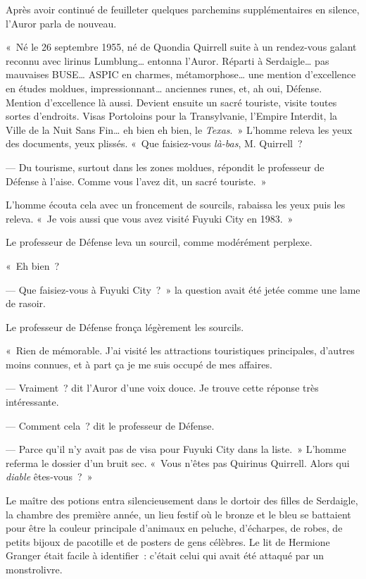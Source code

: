 Après avoir continué de feuilleter quelques parchemins supplémentaires en silence, l'Auror parla de nouveau.

«~Né le 26 septembre 1955, né de Quondia Quirrell suite à un rendez-vous galant reconnu avec lirinus Lumblung… entonna l'Auror. Réparti à Serdaigle… pas mauvaises BUSE… ASPIC en charmes, métamorphose… une mention d'excellence en études moldues, impressionnant… anciennes runes, et, ah oui, Défense. Mention d'excellence là aussi. Devient ensuite un sacré touriste, visite toutes sortes d'endroits. Visas Portoloins pour la Transylvanie, l'Empire Interdit, la Ville de la Nuit Sans Fin… eh bien eh bien, le \emph{Texas}.~» L'homme releva les yeux des documents, yeux plissés. «~Que faisiez-vous \emph{là-bas}, M. Quirrell~?

--- Du tourisme, surtout dans les zones moldues, répondit le professeur de Défense à l'aise. Comme vous l'avez dit, un sacré touriste.~»

L'homme écouta cela avec un froncement de sourcils, rabaissa les yeux puis les releva. «~Je vois aussi que vous avez visité Fuyuki City en 1983.~»

Le professeur de Défense leva un sourcil, comme modérément perplexe.

«~Eh bien~?

--- Que faisiez-vous à Fuyuki City~?~» la question avait été jetée comme une lame de rasoir.

Le professeur de Défense fronça légèrement les sourcils.

«~Rien de mémorable. J'ai visité les attractions touristiques principales, d'autres moins connues, et à part ça je me suis occupé de mes affaires.

--- Vraiment~? dit l'Auror d'une voix douce. Je trouve cette réponse très intéressante.

--- Comment cela~? dit le professeur de Défense.

--- Parce qu'il n'y avait pas de visa pour Fuyuki City dans la liste.~» L'homme referma le dossier d'un bruit sec. «~Vous n'êtes pas Quirinus Quirrell. Alors qui \emph{diable} êtes-vous~?~»

\later

Le maître des potions entra silencieusement dans le dortoir des filles de Serdaigle, la chambre des première année, un lieu festif où le bronze et le bleu se battaient pour être la couleur principale d'animaux en peluche, d'écharpes, de robes, de petits bijoux de pacotille et de posters de gens célèbres. Le lit de Hermione Granger était facile à identifier~: c'était celui qui avait été attaqué par un monstrolivre.

